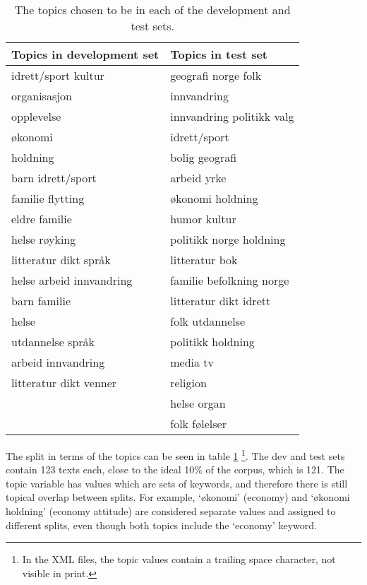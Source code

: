 \begin{table}
  \centering
  \begin{tabular}{ll}
    \toprule
    Topics in development set &       Topics in test set \\
    \midrule
         idrett/sport kultur &       geografi norge folk \\
                organisasjon &               innvandring \\
                  opplevelse & innvandring politikk valg \\
                     økonomi &              idrett/sport \\
                    holdning &            bolig geografi \\
           barn idrett/sport &               arbeid yrke \\
            familie flytting &          økonomi holdning \\
               eldre familie &              humor kultur \\
               helse røyking &   politikk norge holdning \\
       litteratur dikt språk &            litteratur bok \\
    helse arbeid innvandring &  familie befolkning norge \\
                barn familie &    litteratur dikt idrett \\
                       helse &           folk utdannelse \\
            utdannelse språk &         politikk holdning \\
          arbeid innvandring &                  media tv \\
      litteratur dikt venner &                  religion \\
                             &               helse organ \\
                             &             folk følelser \\
    \bottomrule
  \end{tabular}
  \caption[Essay topics in development and test sets]{
    The topics chosen to be in each of the development and test sets.
  }
  \label{tab:topics-in-split}
\end{table}

The split in terms of the topics can be seen in table
\ref{tab:topics-in-split} \footnote{In the XML files, the topic values
contain a trailing space character, not visible in print.}. The dev and test
sets contain 123 texts each, close to the ideal 10\% of the corpus, which is
121. The topic variable has values which are sets of keywords, and therefore
there is still topical overlap between splits. For example, `økonomi'
(economy) and `økonomi holdning' (economy attitude) are considered separate
values and assigned to different splits, even though both topics include the
`economy' keyword.

